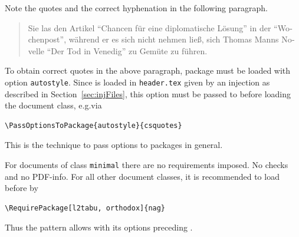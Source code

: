 
Note the quotes and the correct hyphenation in the following paragraph. 

\begin{quote}
\begin{otherlanguage}{german}
  Sie las den Artikel \enquote{Chancen für eine diplomatische Lösung} 
  in der "`Wochenpost"', während er es sich nicht nehmen ließ, %
  sich Thomas Manns Novelle "`{Der Tod in Venedig}"' zu Gemüte zu führen. %
\end{otherlanguage}
\end{quote}

To obtain correct quotes in the above paragraph, 
package  must be loaded with option \texttt{autostyle}. 
Since  is loaded in \texttt{header.tex} 
given by an injection as described in Section~\ref{sec:injFiles}, 
this option must be passed to  
before loading the document class, e.g.\@ via 
%
\begin{Verbatim}[fontsize=\small]
  \PassOptionsToPackage{autostyle}{csquotes}
\end{Verbatim}
%
This is the technique to pass options to packages in general. 

For documents of class \texttt{minimal} there are no requirements imposed. 
No checks and no PDF-info. 
For all other document classes, it is recommended to load  
before  by 
%
\begin{Verbatim}[fontsize=\small]
  \RequirePackage[l2tabu, orthodox]{nag}
\end{Verbatim}
%
Thus the pattern  
allows  with its options preceding . 

